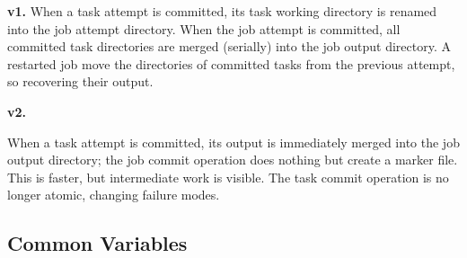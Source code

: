\documentclass[format=acmsmall, screen=true, review=false]{acmart}
\begin{document}
\textbf{v1.}
When a task attempt is committed, its task working directory is renamed into
the job attempt directory.
When the job attempt is committed, all committed task directories are merged
(serially) into the job output directory.
A restarted job move the directories of committed tasks from the previous
attempt, so recovering their output.


\textbf{v2.}

When a task attempt is committed, its output is immediately merged into the
job output directory;
the job commit operation does nothing but create a marker file.
This is faster, but intermediate work is visible.
The task commit operation is no longer atomic, changing failure modes.


\subsection{Common Variables}
\label{subsec:common-variables}
\end{document}
